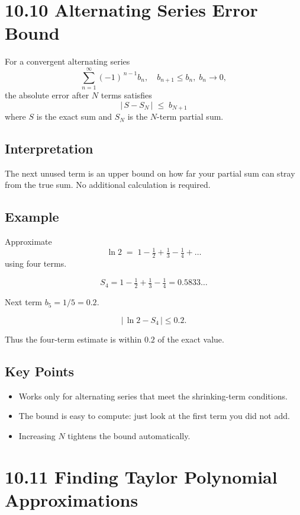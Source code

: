 \documentclass{article}
\begin{document}
\newpage
\section{10.10 Alternating Series Error Bound}

\begin{tcolorbox}[colback=gray!8,colframe=black,title=Error Bound (Leibniz)]
For a convergent alternating series
\[
\sum_{n=1}^{\infty}(-1)^{\,n-1} b_n,
\quad b_{n+1}\le b_n,\; b_n\to 0,
\]
the absolute error after \(N\) terms satisfies
\[
\boxed{\;|\,S - S_N\,| \;\le\; b_{N+1}\;}
\]
where
\(S\) is the exact sum and \(S_N\) is the \(N\)-term partial sum.
\end{tcolorbox}

\subsection*{Interpretation}
The next unused term is an upper bound on how far your partial sum
can stray from the true sum.
No additional calculation is required.

\subsection*{Example}

Approximate
\[
\ln 2
\;=\;
1 - \tfrac12 + \tfrac13 - \tfrac14 + \dots
\]
using four terms.

\[
S_4 = 1 - \tfrac12 + \tfrac13 - \tfrac14 = 0.5833\ldots
\]

Next term \(b_{5}=1/5=0.2\).

\[
|\,\ln 2 - S_4\,| \le 0.2.
\]

Thus the four-term estimate is within \(0.2\) of the exact value.

\subsection*{Key Points}
\begin{itemize}[itemsep=4pt]
  \item Works only for alternating series that meet the shrinking-term conditions.
  \item The bound is easy to compute: just look at the first term you did not add.
  \item Increasing \(N\) tightens the bound automatically.
\end{itemize}

\newpage
\section{10.11 Finding Taylor Polynomial Approximations}
\end{document}
